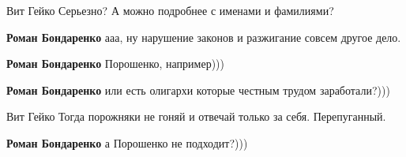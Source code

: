 \begin{itemize}
\begin{itemize}
Вит Гейко Серьезно? А можно подробнее с именами и фамилиями?

 
\textbf{Роман Бондаренко} ааа, ну нарушение законов и разжигание совсем другое дело.

 
\textbf{Роман Бондаренко} Порошенко, например)))

 
\textbf{Роман Бондаренко} или есть олигархи которые честным трудом заработали?)))

 
Вит Гейко Тогда порожняки не гоняй и отвечай только за себя. Перепуганный.

 
\textbf{Роман Бондаренко} а Порошенко не подходит?)))

 

\end{itemize}
\end{itemize}
